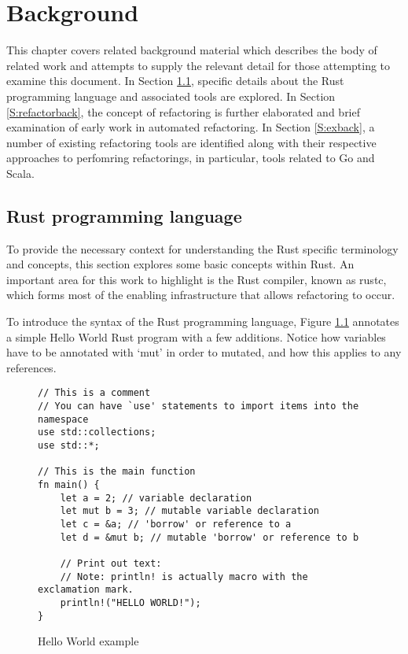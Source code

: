 \chapter{Background}\label{C:back} 
This chapter covers related background material which describes the body of related work and attempts to supply the relevant detail for those attempting to examine this document. In Section \ref{S:rustback}, specific details about the Rust programming language and associated tools are explored. In Section \ref{S:refactorback}, the concept of refactoring is further elaborated and brief examination of early work in automated refactoring. In Section \ref{S:exback}, a number of existing refactoring tools are identified along with their respective approaches to perfomring refactorings, in particular, tools related to Go and Scala. 

\section{Rust programming language}\label{S:rustback}
To provide the necessary context for understanding the Rust specific terminology and concepts, this section explores some basic concepts within Rust. An important area for this work to highlight is the Rust compiler, known as rustc, which forms most of the enabling infrastructure that allows refactoring to occur. 

To introduce the syntax of the Rust programming language, Figure \ref{Fig:hello} annotates a simple Hello World Rust program with a few additions. Notice how variables have to be annotated with `mut' in order to mutated, and how this applies to any references.

\begin{figure}[H]
\centering
\begin{verbatim}
// This is a comment
// You can have `use' statements to import items into the namespace
use std::collections;
use std::*;

// This is the main function
fn main() {
    let a = 2; // variable declaration
    let mut b = 3; // mutable variable declaration
    let c = &a; // 'borrow' or reference to a
    let d = &mut b; // mutable 'borrow' or reference to b

    // Print out text:
    // Note: println! is actually macro with the exclamation mark.
    println!("HELLO WORLD!");
}
\end{verbatim}
\caption{Hello World example}
\label{Fig:hello}
\end{figure}

